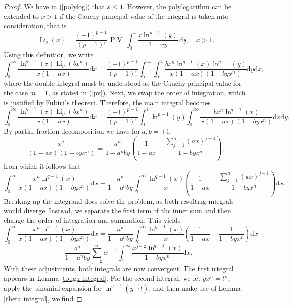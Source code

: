 \documentclass[10pt,a4paper]{amsart}
\begin{document}
\begin{proof}
	We have in (\ref{polylog}) that $x\leqslant1$. However, the polylogarithm can be extended to $x>1$ if the Cauchy principal value of the integral is taken into consideration, that is
	\begin{equation}
		\operatorname{Li}_p(x) = \frac{{(-1)}^{p-1}}{(p-1)!} \,\operatorname{P.V.} \int_0^1 \frac{x \ln^{p-1}(y)}{1 - xy} \, \mathrm{d} y, \quad x > 1.\label{pv}
	\end{equation}
	Using this definition, we write
	\[\int_0^\infty\frac{\ln^{q-1}(x)\operatorname{Li}_p(bx^n)}{x(1-ax)}\mathrm{d} x=\frac{{(-1)}^{p-1}}{(p-1)!}\int_0^\infty\int_0^1\frac{bx^n\ln^{q-1}(x)\ln^{p-1}(y)}{x(1-ax)(1-byx^n)}\mathrm{d} y\mathrm{d} x,\]
	where the double integral must be understood as the Cauchy principal value for the case $m=1$, as stated in (\ref{pv}). 
	Next, we swap the order of integration, which is justified by Fubini's theorem. Therefore, the main integral becomes
	\begin{equation}
		\int_0^\infty\frac{\ln^{q-1}(x)\operatorname{Li}_p(bx^n)}{x(1-ax)}\mathrm{d} x=\frac{{(-1)}^{p-1}}{(p-1)!}\int_0^1\ln^{p-1}(y)\int_0^\infty\frac{bx^n\ln^{q-1}(x)}{x(1-ax)(1-byx^n)}\mathrm{d} x\mathrm{d} y.\label{main}
	\end{equation}
	By partial fraction decomposition we have for $a,b=\pm1$:
	\begin{equation}		\frac{x^{n}}{(1-ax)(1-byx^{n})}=\frac{a^n}{1-a^n by}\left(\frac{1}{1-ax}-\frac{\sum_{j=1}^n (ax)^{j-1}}{1-byx^{n}}\right),\label{pattern}
	\end{equation}
	from which it follows that
	\[\int_0^\infty\frac{x^{n}\ln^{q-1}(x)}{x(1-ax)(1-byx^{n})}\mathrm{d} x=\frac{a^n}{1-a^n by}\int_0^\infty\frac{\ln^{q-1}(x)}{x}\left(\frac{1}{1-ax}-\frac{\sum_{j=1}^n (ax)^{j-1}}{1-byx^{n}}\right)\mathrm{d} x.\]
	Breaking up the integrand does solve the problem, as both resulting integrals would diverge. Instead, we separate the first term of the inner sum and then change the order of integration and summation. This yields
	\[\int_0^\infty\frac{x^{n}\ln^{q-1}(x)}{x(1-ax)(1-byx^{n})}\mathrm{d} x=\frac{a^n}{1-a^n by}\int_0^\infty\frac{\ln^{q-1}(x)}{x}\left(\frac{1}{1-ax}-\frac{1}{1-byx^n}\right)\mathrm{d} x\]
	\[-\frac{a^n}{1-a^n by}\sum_{j=2}^n a^{j-1}\int_0^\infty\frac{x^{j-2}\ln^{q-1}(x)}{1-byx^n}\mathrm{d} x.\]
	With these adjustments, both integrals are now convergent. The first integral appears in Lemma \ref{tough integral}. For the second integral, we let $yx^n=t^n$, apply the binomial expansion for $\ln^{q-1}(y^{-\frac{1}{n}}t)$, and then make use of Lemma \ref{theta integral}, we find

\end{proof}
\end{document}

